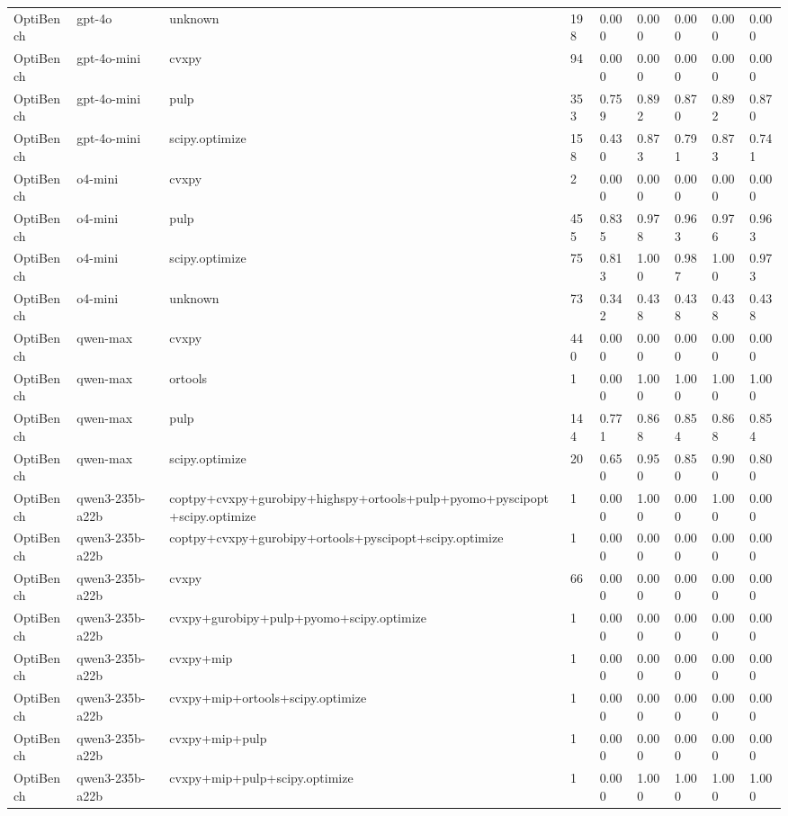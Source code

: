 \begin{table}[t]
\begin{tabular}{lllllllll}
OptiBench & gpt-4o & unknown & 198 & 0.000 & 0.000 & 0.000 & 0.000 & 0.000 \\
OptiBench & gpt-4o-mini & cvxpy & 94 & 0.000 & 0.000 & 0.000 & 0.000 & 0.000 \\
OptiBench & gpt-4o-mini & pulp & 353 & 0.759 & 0.892 & 0.870 & 0.892 & 0.870 \\
OptiBench & gpt-4o-mini & scipy.optimize & 158 & 0.430 & 0.873 & 0.791 & 0.873 & 0.741 \\
OptiBench & o4-mini & cvxpy & 2 & 0.000 & 0.000 & 0.000 & 0.000 & 0.000 \\
OptiBench & o4-mini & pulp & 455 & 0.835 & 0.978 & 0.963 & 0.976 & 0.963 \\
OptiBench & o4-mini & scipy.optimize & 75 & 0.813 & 1.000 & 0.987 & 1.000 & 0.973 \\
OptiBench & o4-mini & unknown & 73 & 0.342 & 0.438 & 0.438 & 0.438 & 0.438 \\
OptiBench & qwen-max & cvxpy & 440 & 0.000 & 0.000 & 0.000 & 0.000 & 0.000 \\
OptiBench & qwen-max & ortools & 1 & 0.000 & 1.000 & 1.000 & 1.000 & 1.000 \\
OptiBench & qwen-max & pulp & 144 & 0.771 & 0.868 & 0.854 & 0.868 & 0.854 \\
OptiBench & qwen-max & scipy.optimize & 20 & 0.650 & 0.950 & 0.850 & 0.900 & 0.800 \\
OptiBench & qwen3-235b-a22b & coptpy+cvxpy+gurobipy+highspy+ortools+pulp+pyomo+pyscipopt+scipy.optimize & 1 & 0.000 & 1.000 & 0.000 & 1.000 & 0.000 \\
OptiBench & qwen3-235b-a22b & coptpy+cvxpy+gurobipy+ortools+pyscipopt+scipy.optimize & 1 & 0.000 & 0.000 & 0.000 & 0.000 & 0.000 \\
OptiBench & qwen3-235b-a22b & cvxpy & 66 & 0.000 & 0.000 & 0.000 & 0.000 & 0.000 \\
OptiBench & qwen3-235b-a22b & cvxpy+gurobipy+pulp+pyomo+scipy.optimize & 1 & 0.000 & 0.000 & 0.000 & 0.000 & 0.000 \\
OptiBench & qwen3-235b-a22b & cvxpy+mip & 1 & 0.000 & 0.000 & 0.000 & 0.000 & 0.000 \\
OptiBench & qwen3-235b-a22b & cvxpy+mip+ortools+scipy.optimize & 1 & 0.000 & 0.000 & 0.000 & 0.000 & 0.000 \\
OptiBench & qwen3-235b-a22b & cvxpy+mip+pulp & 1 & 0.000 & 0.000 & 0.000 & 0.000 & 0.000 \\
OptiBench & qwen3-235b-a22b & cvxpy+mip+pulp+scipy.optimize & 1 & 0.000 & 1.000 & 1.000 & 1.000 & 1.000 \\

\end{tabular}
\end{table}
